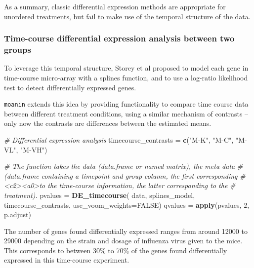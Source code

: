 \documentclass[9pt,a4paper,]{extarticle}
\newenvironment{Shaded}{\begin{snugshade}}{\end{snugshade}}
\newcommand{\CommentTok}[1]{\textcolor[rgb]{0.56,0.35,0.01}{\textit{#1}}}
\newcommand{\DataTypeTok}[1]{\textcolor[rgb]{0.13,0.29,0.53}{#1}}
\newcommand{\DecValTok}[1]{\textcolor[rgb]{0.00,0.00,0.81}{#1}}
\newcommand{\KeywordTok}[1]{\textcolor[rgb]{0.13,0.29,0.53}{\textbf{#1}}}
\newcommand{\NormalTok}[1]{#1}
\newcommand{\OtherTok}[1]{\textcolor[rgb]{0.56,0.35,0.01}{#1}}
\newcommand{\StringTok}[1]{\textcolor[rgb]{0.31,0.60,0.02}{#1}}
\begin{document}
As a summary, classic differential expression methods are appropriate for
unordered treatments, but fail to make use of the temporal structure of the data.

\hypertarget{time-course-differential-expression-analysis-between-two-groups}{%
\subsubsection{Time-course differential expression analysis between two groups}\label{time-course-differential-expression-analysis-between-two-groups}}

To leverage this temporal structure, Storey et al \citep{storey:significance}
proposed to model each gene in time-course micro-array with a splines
function, and to use a log-ratio likelihood test to detect differentially
expressed genes.

\texttt{moanin} extends this idea by providing functionality to compare time course
data between different treatment conditions, using a similar mechanism of
contrasts -- only now the contrasts are differences between the estimated
means.

\begin{Shaded}
\begin{Highlighting}[]
\CommentTok{# Differential expression analysis}
\NormalTok{timecourse_contrasts =}\StringTok{ }\KeywordTok{c}\NormalTok{(}\StringTok{"M-K"}\NormalTok{, }\StringTok{"M-C"}\NormalTok{, }\StringTok{"M-VL"}\NormalTok{, }\StringTok{"M-VH"}\NormalTok{)}

\CommentTok{# The function takes the data (data.frame or named matrix), the meta data}
\CommentTok{# (data.frame containing a timepoint and group column, the first corresponding}
\CommentTok{#<c2><a0>to the time-course information, the latter corresponding to the}
\CommentTok{# treatment).}
\NormalTok{pvalues =}\StringTok{ }\KeywordTok{DE_timecourse}\NormalTok{(}
\NormalTok{    data, splines_model, timecourse_contrasts,}
    \DataTypeTok{use_voom_weights=}\OtherTok{FALSE}\NormalTok{)}
\NormalTok{qvalues =}\StringTok{ }\KeywordTok{apply}\NormalTok{(pvalues, }\DecValTok{2}\NormalTok{, p.adjust)}
\end{Highlighting}
\end{Shaded}

The number of genes found differentially expressed ranges from around 12000 to
29000 depending on the strain and dosage of influenza virus given to the mice.
This corresponds to between 30\% to 70\% of the genes found differentially
expressed in this time-course experiment.
\end{document}
